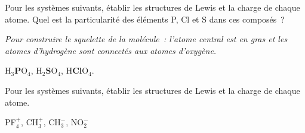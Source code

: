 
Pour les syst\`emes suivants, \'etablir les structures de Lewis et la charge de chaque atome.
Quel est la particularit\'e des \'el\'ements P, Cl et S dans ces compos\'es~?

{\small \textit{Pour construire le squelette de la mol\'ecule~: l'atome central est en gras et les atomes d'hydrog\`ene 
sont connect\'es aux atomes d'oxyg\`ene.}}

\vspace{0.5cm}

\centerline{H$_3$\textbf{P}O$_4$, H$_2$\textbf{S}O$_4$, H\textbf{Cl}O$_4$.}


Pour les syst\`emes suivants, \'etablir les structures de Lewis et la charge de chaque atome.

\centerline{PF$_4^+$, CH$_3^+$, CH$_3^-$, NO$_2^-$}

%
%
%
%
